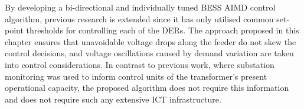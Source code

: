 By developing a bi-directional and individually tuned BESS AIMD control algorithm, previous research is extended since it has only utilised common set-point thresholds for controlling each of the DERs.
The approach proposed in this chapter ensures that unavoidable voltage drops along the feeder do not skew the control decisions, and voltage oscillations caused by demand variation are taken into control considerations.
In contrast to previous work, where substation monitoring was used to inform control units of the transformer's present operational capacity, the proposed algorithm does not require this information and does not require such any extensive ICT infrastructure.





